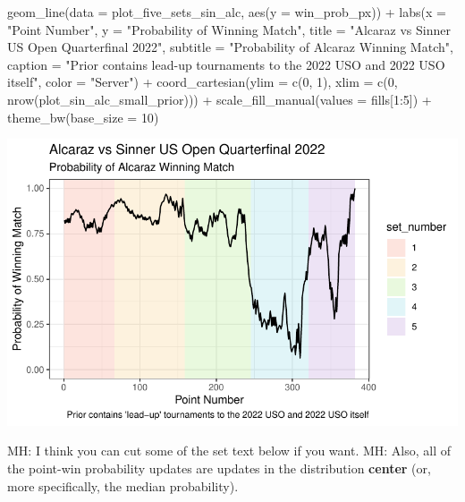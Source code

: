 \documentclass[
  letterpaper,
  DIV=11,
  numbers=noendperiod]{scrartcl}
\newenvironment{Shaded}{\begin{snugshade}}{\end{snugshade}}
\newcommand{\AttributeTok}[1]{\textcolor[rgb]{0.40,0.45,0.13}{#1}}
\newcommand{\DecValTok}[1]{\textcolor[rgb]{0.68,0.00,0.00}{#1}}
\newcommand{\FunctionTok}[1]{\textcolor[rgb]{0.28,0.35,0.67}{#1}}
\newcommand{\NormalTok}[1]{\textcolor[rgb]{0.00,0.23,0.31}{#1}}
\newcommand{\SpecialCharTok}[1]{\textcolor[rgb]{0.37,0.37,0.37}{#1}}
\newcommand{\StringTok}[1]{\textcolor[rgb]{0.13,0.47,0.30}{#1}}
\begin{document}
\begin{Shaded}
\begin{Highlighting}[]
  \FunctionTok{geom\_line}\NormalTok{(}\AttributeTok{data =}\NormalTok{ plot\_five\_sets\_sin\_alc, }\FunctionTok{aes}\NormalTok{(}\AttributeTok{y =}\NormalTok{ win\_prob\_px)) }\SpecialCharTok{+}
  \FunctionTok{labs}\NormalTok{(}\AttributeTok{x =} \StringTok{"Point Number"}\NormalTok{,}
       \AttributeTok{y =} \StringTok{"Probability of Winning Match"}\NormalTok{,}
       \AttributeTok{title =} \StringTok{"Alcaraz vs Sinner US Open Quarterfinal 2022"}\NormalTok{,}
       \AttributeTok{subtitle =} \StringTok{"Probability of Alcaraz Winning Match"}\NormalTok{,}
       \AttributeTok{caption =} \StringTok{"Prior contains \textquotesingle{}lead{-}up\textquotesingle{} tournaments to the 2022 USO and 2022 USO itself"}\NormalTok{,}
       \AttributeTok{color =} \StringTok{"Server"}\NormalTok{) }\SpecialCharTok{+}
  \FunctionTok{coord\_cartesian}\NormalTok{(}\AttributeTok{ylim =} \FunctionTok{c}\NormalTok{(}\DecValTok{0}\NormalTok{, }\DecValTok{1}\NormalTok{),}
                  \AttributeTok{xlim =} \FunctionTok{c}\NormalTok{(}\DecValTok{0}\NormalTok{, }\FunctionTok{nrow}\NormalTok{(plot\_sin\_alc\_small\_prior))) }\SpecialCharTok{+}
  \FunctionTok{scale\_fill\_manual}\NormalTok{(}\AttributeTok{values =}\NormalTok{ fills[}\DecValTok{1}\SpecialCharTok{:}\DecValTok{5}\NormalTok{]) }\SpecialCharTok{+}
  \FunctionTok{theme\_bw}\NormalTok{(}\AttributeTok{base\_size =} \DecValTok{10}\NormalTok{)}
\end{Highlighting}
\end{Shaded}

\includegraphics{Project_Write_Up_files/figure-pdf/unnamed-chunk-21-1.pdf}

\linespread{2}

MH: I think you can cut some of the set text below if you want. MH:
Also, all of the point-win probability updates are updates in the
distribution \textbf{center} (or, more specifically, the median
probability).
\end{document}
